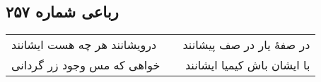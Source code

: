 \begin{center}
\section*{رباعی شماره ۲۵۷}
\label{sec:sh257}
\begin{longtable}{l p{0.5cm} r}
درویشانند هر چه هست ایشانند
&&
در صفهٔ یار در صف پیشانند
\\
خواهی که مس وجود زر گردانی
&&
با ایشان باش کیمیا ایشانند
\\
\end{longtable}
\end{center}
